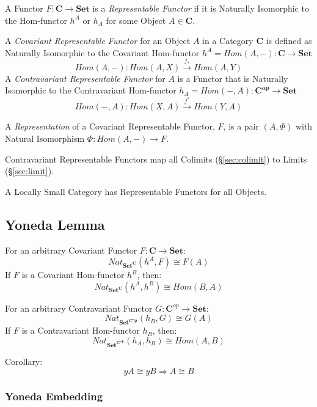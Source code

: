 A Functor $F : \mathbf{C} \rightarrow \mathbf{Set}$ is a
\emph{Representable Functor} if it is Naturally Isomorphic to the
Hom-functor $h^A$ or $h_A$ for some Object $A \in \mathbf{C}$.

A \emph{Covariant Representable Functor} for an Object $A$ in a
Category $\mathbf{C}$ is defined as Naturally Isomorphic to the
Covariant Hom-functor $h^A = Hom(A,-) : \mathbf{C} \rightarrow
\mathbf{Set}$
\[
  Hom(A,-) : Hom(A,X) \xrightarrow{f_*} Hom(A,Y)
\]
A \emph{Contravariant Representable Functor} for $A$ is a Functor that
is Naturally Isomorphic to the Contravariant Hom-functor $h_A =
Hom(-,A) : \mathbf{C^{op}} \rightarrow \mathbf{Set}$
\[
  Hom(-,A) : Hom(X,A) \xrightarrow{f^*} Hom(Y,A)
\]

A \emph{Representation} of a Covariant Representable Functor, $F$, is
a pair $(A, \Phi)$ with Natural Isomorphism $\Phi : Hom(A,-)
\rightarrow F$.

Contravariant Representable Functors map all Colimits
(\S\ref{sec:colimit}) to Limits (\S\ref{sec:limit}).

A Locally Small Category has Representable Functors for all Objects.



\subsection{Yoneda Lemma}\label{sec:yoneda_lemma}

For an arbitrary Covariant Functor $F : \mathbf{C} \rightarrow
\mathbf{Set}$:
\[
  Nat_\mathbf{Set^C}(h^A,F) \cong F(A)
\]
If $F$ is a Covariant Hom-functor $h^B$, then:
\[
  Nat_\mathbf{Set^C}(h^A,h^B) \cong Hom(B,A)
\]

For an arbitrary Contravariant Functor $G : \mathbf{C}^{op} \rightarrow
\mathbf{Set}$:
\[
  Nat_\mathbf{Set^{C^op}}(h_B,G) \cong G(A)
\]
If $F$ is a Contravariant Hom-functor $h_B$, then:
\[
  Nat_\mathbf{Set^{C^{op}}}(h_A,h_B) \cong Hom(A,B)
\]

Corollary:
\[
  yA \cong yB \Rightarrow A \cong B
\]



\subsubsection{Yoneda Embedding}\label{sec:yoneda_embedding}

